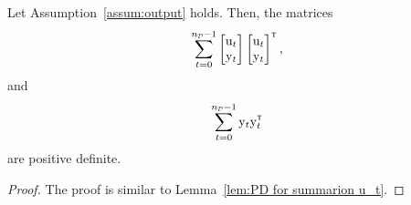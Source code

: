 \begin{lemma}\label{lem:PD for summarion y_t}
    Let Assumption~\ref{assum:output} holds. Then, the matrices 
    \begin{equation}
        \sum_{t=0}^{\nD-1}
        \begin{bmatrix}
            \vcu_t \\ \vcy_t
        \end{bmatrix}
        \begin{bmatrix}
            \vcu_t \\ \vcy_t
        \end{bmatrix}^\tr,
    \end{equation}
    and
    \begin{equation}
        \sum_{t=0}^{\nD-1}
            \vcy_t \vcy_t^\tr
    \end{equation}
    are positive definite.
\end{lemma}
\begin{proof}
    The proof is similar to Lemma~\ref{lem:PD for summarion u_t}.
\end{proof}


